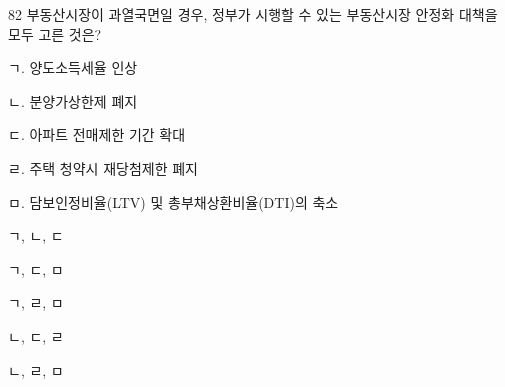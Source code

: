 \begin{question}{82}
부동산시장이 과열국면일 경우, 정부가 시행할 수 있는 부동산시장 안정화 대책을 모두 고른 것은?
\begin{framedtext}
ㄱ. 양도소득세율 인상 \par
ㄴ. 분양가상한제 폐지 \par
ㄷ. 아파트 전매제한 기간 확대 \par
ㄹ. 주택 청약시 재당첨제한 폐지 \par
ㅁ. 담보인정비율(LTV) 및 총부채상환비율(DTI)의 축소
\end{framedtext}
\begin{choices}
  \item ㄱ, ㄴ, ㄷ
  \item ㄱ, ㄷ, ㅁ
  \item ㄱ, ㄹ, ㅁ
  \item ㄴ, ㄷ, ㄹ
  \item ㄴ, ㄹ, ㅁ
\end{choices}
\end{question}
